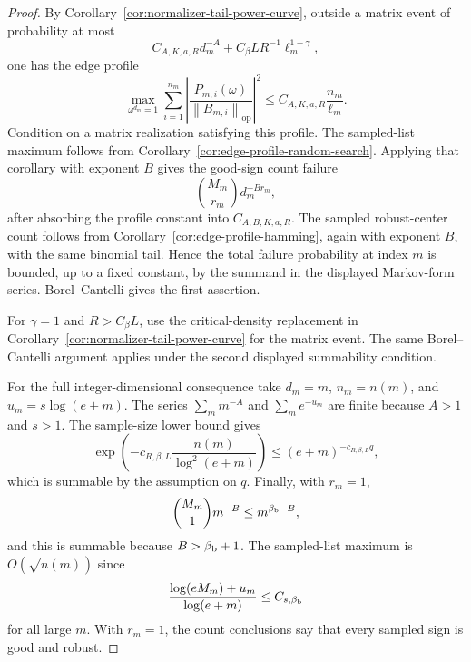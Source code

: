 \documentclass[11pt]{amsart}
\numberwithin{equation}{section}
\theoremstyle{definition}
\theoremstyle{remark}
\newcommand{\op}{\mathrm{op}}
\newcommand{\norm}[1]{\left\lVert #1\right\rVert}
\begin{document}
\begin{proof}
By Corollary~\ref{cor:normalizer-tail-power-curve}, outside a matrix event of
probability at most
\[
  C_{A,K,a,R}d_m^{-A}+C_\beta L R^{-1}\ell_m^{1-\gamma},
\]
one has the edge profile
\[
  \max_{\omega^{d_m}=1}\sum_{i=1}^{n_m}
  \left|\frac{P_{m,i}(\omega)}{\norm{B_{m,i}}_{\op}}\right|^2
  \le C_{A,K,a,R}\frac{n_m}{\ell_m}.
\]
Condition on a matrix realization satisfying this profile.  The sampled-list
maximum follows from Corollary~\ref{cor:edge-profile-random-search}.  Applying
that corollary with exponent \(B\) gives the good-sign count failure
\[
  \binom{M_m}{r_m}d_m^{-B r_m},
\]
after absorbing the profile constant into \(C_{A,B,K,a,R}\).  The sampled
robust-center count follows from Corollary~\ref{cor:edge-profile-hamming}, again
with exponent \(B\), with the same binomial tail.  Hence the total failure
probability at index \(m\) is bounded, up to a fixed constant, by the summand in
the displayed Markov-form series.  Borel--Cantelli gives the first assertion.

For \(\gamma=1\) and \(R>C_\beta L\), use the critical-density replacement in
Corollary~\ref{cor:normalizer-tail-power-curve} for the matrix event.  The same
Borel--Cantelli argument applies under the second displayed summability
condition.

For the full integer-dimensional consequence take \(d_m=m\), \(n_m=n(m)\), and
\(u_m=s\log(e+m)\).  The series \(\sum_m m^{-A}\) and
\(\sum_m e^{-u_m}\) are finite because \(A>1\) and \(s>1\).  The sample-size
lower bound gives
\[
  \exp\left(-c_{R,\beta,L}\frac{n(m)}{\log^2(e+m)}\right)
  \le (e+m)^{-c_{R,\beta,L}q},
\]
which is summable by the assumption on \(q\).  Finally, with \(r_m=1\),
\[
  \binom{M_m}{1}m^{-B}\le m^{\beta_{\rm b}-B},
\]
and this is summable because \(B>\beta_{\rm b}+1\).  The sampled-list maximum is
\(O(\sqrt{n(m)})\) since
\[
  \frac{\log(eM_m)+u_m}{\log(e+m)}
  \le C_{s,\beta_{\rm b}}
\]
for all large \(m\).  With \(r_m=1\), the count conclusions say that every
sampled sign is good and robust.
\end{proof}
\end{document}
